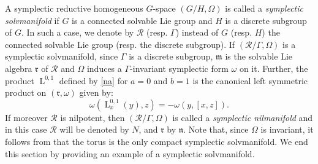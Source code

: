 \documentclass[preprint,12pt,1p]{elsarticle}
\theoremstyle{plain}
\theoremstyle{definition}
\newcommand{\la}{\operatorname{L}^{0,1}}
\newcommand{\LS}{\operatorname{L}}
\numberwithin{equation}{section}
\newcommand{\nlp}{\mathfrak{n}}
\begin{document}
A symplectic reductive homogeneous $G$-space $(G/H,\Omega)$ is called a \textit{symplectic solvmanifold} if $G$ is a connected solvable Lie group and $H$ is a discrete subgroup of $G$. In such a case, we denote by $\mathcal{R}$ (resp. $\Gamma$) instead of $G$ (resp. $H$) the connected solvable Lie group (resp. the discrete subgroup). If $(\mathcal{R}/\Gamma,\Omega)$ is a symplectic solvmanifold, since $\Gamma$ is a discrete subgroup, $\mathfrak{m}$ is the solvable Lie algebra $\mathfrak{r}$ of $\mathcal{R}$ and $\Omega$ induces a $\Gamma$-invariant symplectic form $\omega$ on it. Further, the product $\la$ defined by \eqref{na} for $a=0$ and $b=1$ is the canonical left symmetric product on $(\mathfrak{r},\omega)$ given by:	\begin{equation}\label{LiGrpLS}
\omega\left(\LS^{0,1}_x(y),z\right)=-\omega\left(y,[x,z]\right).\end{equation}
If moreover $\mathcal{R}$ is nilpotent, then $(\mathcal{R}/\Gamma,\Omega)$ is called a \textit{symplectic nilmanifold} and in this case $\mathcal{R}$ will be denoted by $N$, and $\mathfrak{r}$ by $\nlp$. Note that, since $\Omega$ is invariant, it follows from \cite[p. $340$]{Hu} that the torus is the only compact symplectic solvmanifold.
We end this section by providing an example of a symplectic solvmanifold.
\end{document}
